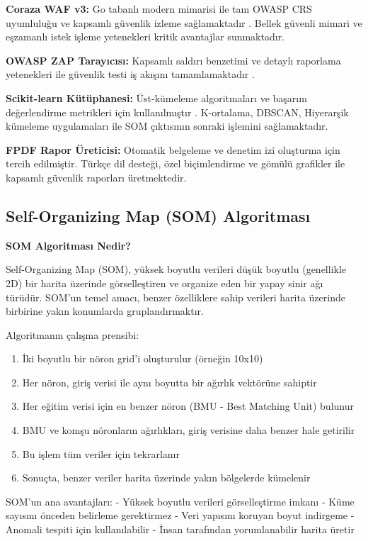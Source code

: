 \textbf{Coraza WAF v3:} Go tabanlı modern mimarisi ile tam OWASP CRS uyumluluğu ve kapsamlı güvenlik izleme sağlamaktadır \cite{coraza2023}. Bellek güvenli mimari ve eşzamanlı istek işleme yetenekleri kritik avantajlar sunmaktadır.

\textbf{OWASP ZAP Tarayıcısı:} Kapsamlı saldırı benzetimi ve detaylı raporlama yetenekleri ile güvenlik testi iş akışını tamamlamaktadır \cite{zaproxy2023}.

\newpage

\textbf{Scikit-learn Kütüphanesi:} Üst-kümeleme algoritmaları ve başarım değerlendirme metrikleri için kullanılmıştır \cite{scikit_learn2011}. K-ortalama, DBSCAN, Hiyerarşik kümeleme uygulamaları ile SOM çıktısının sonraki işlemini sağlamaktadır.

\textbf{FPDF Rapor Üreticisi:} Otomatik belgeleme ve denetim izi oluşturma için tercih edilmiştir. Türkçe dil desteği, özel biçimlendirme ve gömülü grafikler ile kapsamlı güvenlik raporları üretmektedir.

\subsection{Self-Organizing Map (SOM) Algoritması}

\textbf{SOM Algoritması Nedir?}

Self-Organizing Map (SOM), yüksek boyutlu verileri düşük boyutlu (genellikle 2D) bir harita üzerinde görselleştiren ve organize eden bir yapay sinir ağı türüdür. SOM'un temel amacı, benzer özelliklere sahip verileri harita üzerinde birbirine yakın konumlarda gruplandırmaktır.

Algoritmanın çalışma prensibi:
\begin{enumerate}
    \item İki boyutlu bir nöron grid'i oluşturulur (örneğin 10x10)
    \item Her nöron, giriş verisi ile aynı boyutta bir ağırlık vektörüne sahiptir
    \item Her eğitim verisi için en benzer nöron (BMU - Best Matching Unit) bulunur
    \item BMU ve komşu nöronların ağırlıkları, giriş verisine daha benzer hale getirilir
    \item Bu işlem tüm veriler için tekrarlanır
    \item Sonuçta, benzer veriler harita üzerinde yakın bölgelerde kümelenir
\end{enumerate}

SOM'un ana avantajları:
- Yüksek boyutlu verileri görselleştirme imkanı
- Küme sayısını önceden belirleme gerektirmez
- Veri yapısını koruyan boyut indirgeme
- Anomali tespiti için kullanılabilir
- İnsan tarafından yorumlanabilir harita üretir

